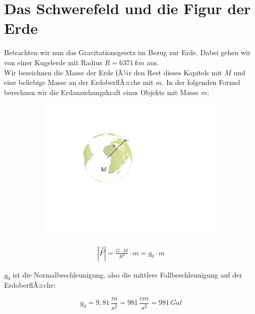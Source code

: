 \section{Das Schwerefeld und die Figur der Erde}

Betrachten wir nun das Gravitationsgesetz im Bezug zur Erde. Dabei gehen wir von einer Kugelerde mit Radius $R = 6371\,\si{km} $ aus.\\
Wir bezeichnen die Masse der Erde fÃ¼r den Rest dieses Kapitels mit $M$ und eine beliebige Masse an der ErdoberflÃ¤che mit $m$. In der folgenden Formel berechnen wir die Erdanziehungskraft eines Objekts mit Masse $m$: 


\begin{figure}[H]
	\begin{subfigure}[m]{0.5\textwidth}
	\centering
		\includegraphics[scale=0.3]{GravimetrieBilder/Erde_mit_Masse_und_Radius}
	\end{subfigure}
	\begin{subfigure}[m]{0.5\textwidth}
	\centering
		\[\begin{aligned}
			|\vec{F}| = \frac{G\cdot M}{R^2} \cdot m = g_0 \cdot m
		\end{aligned}\]
	\end{subfigure}
\end{figure}


$g_0$ ist die Normalbeschleunigung, also die mittlere Fallbeschleunigung auf der ErdoberflÃ¤che:

\begin{equation*}
	g_0 = 9,81\,\frac{\si{m}}{\si{s^2}} = 981\,\frac{\si{cm}}{\si{s^2}} = 981\,\si{Gal}
\end{equation*} 

